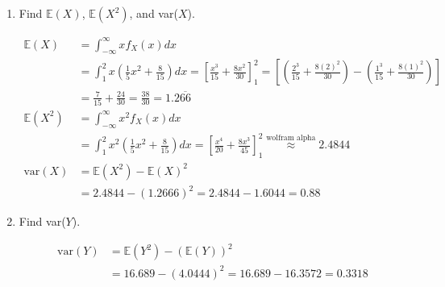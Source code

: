     \begin{enumerate}[label=(\alph*)]
        \item Find $\mathbb{E}(X)$, $\mathbb{E}(X^{2})$, and var($X$).
        \\
        \begin{mdframed}
            \begin{align*}
                \mathbb{E}(X)       & = \int_{-\infty}^{\infty} xf_{X}(x)dx                 \\
                                    & = \int_{1}^{2} x\left(\frac{1}{5}x^{2} + \frac{8}{15}\right)dx
                                      = \left[\frac{x^{3}}{15} + \frac{8x^{2}}{30}\right]_{1}^{2}
                                      = \left[
                                        \left(\frac{2^{3}}{15} + \frac{8(2)^{2}}{30}\right) -
                                        \left(\frac{1^{3}}{15} + \frac{8(1)^{2}}{30}\right)
                                    \right]                                                 \\
                                    & = \frac{7}{15} + \frac{24}{30} = \boxed{\frac{38}{30} = 1.2\overline{66}}\\
                \mathbb{E}(X^{2})   & = \int_{-\infty}^{\infty} x^{2}f_{X}(x)dx             \\
                                    & = \int_{1}^{2} x^{2}\left(\frac{1}{5}x^{2} + \frac{8}{15}\right)dx
                                    = \left[\frac{x^{4}}{20} + \frac{8x^{3}}{45}\right]_{1}^{2}
                                    \stackrel{\text{wolfram alpha}}{\approx} \boxed{2.4844} \\
                \text{var}(X)       & = \mathbb{E}(X^{2}) - \mathbb{E}(X)^{2}               \\
                                    & = 2.4844 - (1.2666)^{2} = 2.4844 - 1.6044 = \boxed{0.88}
            \end{align*}
        \end{mdframed}

        \item Find var($Y$).
        \\
        \begin{mdframed}
            \begin{align*}
                \text{var}(Y)   & = \mathbb{E}(Y^{2}) - (\mathbb{E}(Y))^{2}                 \\
                                & = 16.689 - (4.0444)^{2} = 16.689 - 16.3572 = \boxed{0.3318}
            \end{align*}
        \end{mdframed}


\end{enumerate}
